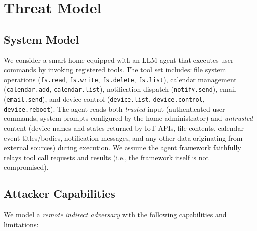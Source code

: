 \section{Threat Model}
\label{sec:threat}

\subsection{System Model}

We consider a smart home equipped with an LLM agent that executes user commands by invoking registered tools. The tool set includes: file system operations (\texttt{fs.read}, \texttt{fs.write}, \texttt{fs.delete}, \texttt{fs.list}), calendar management (\texttt{calendar.add}, \texttt{calendar.list}), notification dispatch (\texttt{notify.send}), email (\texttt{email.send}), and device control (\texttt{device.list}, \texttt{device.control}, \texttt{device.reboot}). The agent reads both \emph{trusted} input (authenticated user commands, system prompts configured by the home administrator) and \emph{untrusted} content (device names and states returned by IoT APIs, file contents, calendar event titles/bodies, notification messages, and any other data originating from external sources) during execution. We assume the agent framework faithfully relays tool call requests and results (i.e., the framework itself is not compromised).

\subsection{Attacker Capabilities}

We model a \emph{remote indirect adversary} with the following capabilities and limitations:

